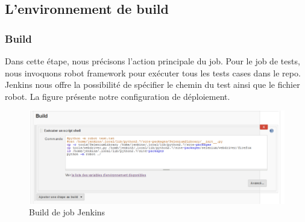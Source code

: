 \subsection{L’environnement de build}
\subsubsection{Build}
Dans cette étape, nous précisons l’action principale du job. Pour le job de tests, nous invoquons robot framework pour exécuter tous les tests cases dans le repo. Jenkins nous offre la possibilité de spécifier le chemin du test ainsi que le fichier robot. La figure présente notre configuration de déploiement.
\begin{figure}[H]
	\centering
	\includegraphics[width=0.8\linewidth]{img/jenkins/build}
	\caption[Build de job Jenkins]{Build de job Jenkins}
	\label{fig:build}
\end{figure}

